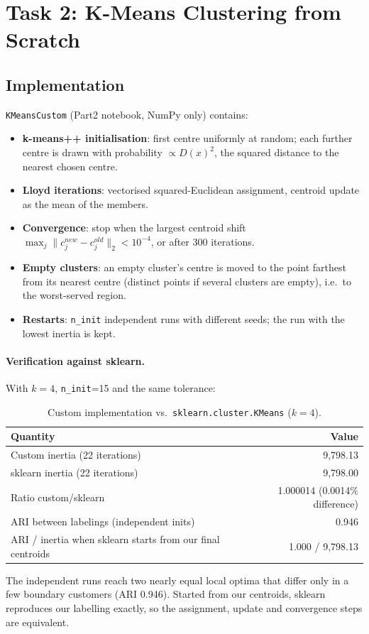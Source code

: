 \documentclass[11pt]{article}
\begin{document}
\section{Task 2: K-Means Clustering from Scratch}
\subsection{Implementation}
\texttt{KMeansCustom} (Part2 notebook, NumPy only) contains:
\begin{itemize}
\item \textbf{k-means++ initialisation}: first centre uniformly at random; each further centre is
drawn with probability $\propto D(x)^2$, the squared distance to the nearest chosen centre.
\item \textbf{Lloyd iterations}: vectorised squared-Euclidean assignment, centroid update as the
mean of the members.
\item \textbf{Convergence}: stop when the largest centroid shift
$\max_j\lVert c_j^{new}-c_j^{old}\rVert_2 < 10^{-4}$, or after 300 iterations.
\item \textbf{Empty clusters}: an empty cluster's centre is moved to the point farthest from its
nearest centre (distinct points if several clusters are empty), i.e.\ to the worst-served region.
\item \textbf{Restarts}: \texttt{n\_init} independent runs with different seeds; the run with the
lowest inertia is kept.
\end{itemize}

\paragraph{Verification against sklearn.} With $k=4$, \texttt{n\_init}=15 and the same tolerance:
\begin{table}[H]\centering\small
\caption{Custom implementation vs.\ \texttt{sklearn.cluster.KMeans} ($k=4$).}
\begin{tabular}{@{}lr@{}}\toprule
Quantity & Value\\\midrule
Custom inertia (22 iterations) & 9{,}798.13\\
sklearn inertia (22 iterations) & 9{,}798.00\\
Ratio custom/sklearn & 1.000014 (0.0014\% difference)\\
ARI between labelings (independent inits) & 0.946\\
ARI / inertia when sklearn starts from our final centroids & 1.000 / 9{,}798.13\\\bottomrule
\end{tabular}\end{table}
The independent runs reach two nearly equal local optima that differ only in a few boundary
customers (ARI 0.946). Started from our centroids, sklearn reproduces our labelling exactly,
so the assignment, update and convergence steps are equivalent.
\end{document}
